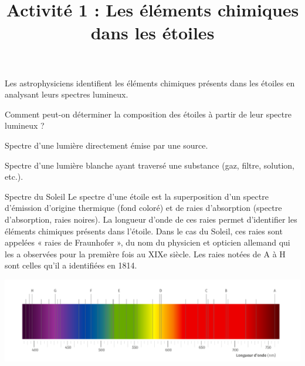 \documentclass[24pt]{article}
\newcommand{\titreActivite}{\huge Activité 1 : Les éléments chimiques dans les étoiles} %
\begin{document}
\thispagestyle{fancy}

\date{}
\title{\titreActivite}
\maketitle %

\begin{center}
    Les astrophysiciens identifient les éléments chimiques présents dans les étoiles en analysant leurs spectres lumineux.

    Comment peut-on déterminer la composition des étoiles à partir de leur spectre lumineux ?
\end{center}


\begin{minipage}[c]{0.45\textwidth}
    \begin{definition}
        Spectre d’une lumière directement émise par une source.
    \end{definition}
\end{minipage}
\hspace{0.1\textwidth}
\begin{minipage}[c]{0.45\textwidth}
    \begin{definition}
        Spectre d’une lumière blanche ayant traversé une substance (gaz, filtre, solution, etc.).

    \end{definition}
\end{minipage}

\begin{documentpeda}{Spectre du Soleil}
    Le spectre d’une étoile est la superposition d’un spectre
    d'émission d’origine thermique (fond coloré) et de raies d’absorption (spectre d’absorption, raies noires).
    La longueur d’onde de ces raies permet d’identifier les éléments chimiques présents dans l’étoile.
    Dans le cas du Soleil, ces raies sont appelées « raies de Fraunhofer »,
    du nom du physicien et opticien allemand qui les a observées pour la première fois au XIXe siècle.
    Les raies notées de A à H sont celles qu’il a identifiées en 1814.

    \begin{center}
        \includegraphics[width=0.7\columnwidth]{spectre.png}
    \end{center}
\end{documentpeda}
\end{document}

